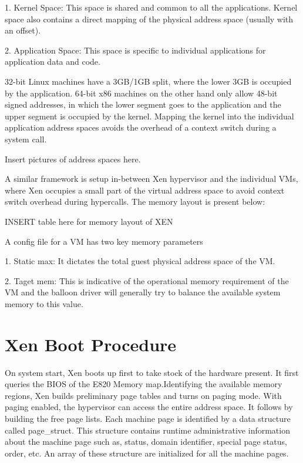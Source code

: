 1. Kernel Space: This space is shared and common to all the applications. Kernel space also contains a direct mapping of the physical address space (usually with an offset).

2. Application Space: This space is specific to individual applications for application data and code.

32-bit Linux machines have a 3GB/1GB split, where the lower 3GB is occupied by the application. 64-bit x86 machines on the other hand only allow 48-bit signed addresses, in which the lower segment goes to the application and the upper segment is occupied by the kernel. Mapping the kernel into the individual application address spaces avoids the overhead of a context switch during a system call.

Insert pictures of address spaces here.

A similar framework is setup in-between Xen hypervisor and the individual VMs, where Xen occupies a small part of the virtual address space to avoid context switch overhead during hypercalls. The memory layout is present below:

INSERT table here for memory layout of XEN




A config file for a VM has two key memory parameters

1. Static max: It dictates the total guest physical address space of the VM.

2. Taget mem: This is indicative of the operational memory requirement of the VM and the balloon driver will generally try to balance the available system memory to this value.



\section{Xen Boot Procedure}
On system start, Xen boots up first to take stock of the hardware present. It first queries the BIOS of the E820 Memory map.Identifying the available  memory regions, Xen builds preliminary page tables and turns on paging mode. With paging enabled, the hypervisor can access the entire address space. It follows by building the free page lists. Each machine page is identified by a data structure called page\_struct. This structure contains runtime administrative information about the machine page such as, status, domain identifier, special page status, order, etc. An array of these structure are initialized for all the machine pages. 
 

